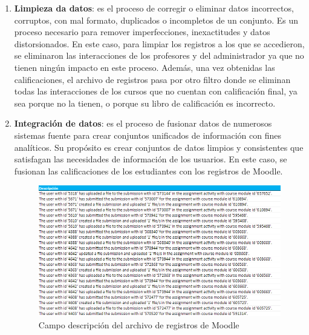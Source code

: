 \begin{enumerate}
    \item \textbf{Limpieza da datos}: es el proceso de corregir o eliminar datos incorrectos, corruptos, con mal formato, duplicados o incompletos de un conjunto. Es un proceso necesario para remover imperfecciones, inexactitudes y datos distorsionados. En este caso, para limpiar los registros a los que se accedieron, se eliminaron las interacciones de los profesores y del administrador ya que no tienen ningún impacto en este proceso. Además, una vez obtenidas las calificaciones, el archivo de registros pasa por otro filtro donde se eliminan todas las interacciones de los cursos que no cuentan con calificación final, ya sea porque no la tienen, o porque su libro de calificación es incorrecto.
    \item \textbf{Integración de datos}: es el proceso de fusionar datos de numerosos sistemas fuente para crear conjuntos unificados de información con fines analíticos. Su propósito es crear conjuntos de datos limpios y consistentes que satisfagan las necesidades de información de los usuarios. En este caso, se fusionan las calificaciones de los estudiantes con los registros de Moodle.
    
    \newpage
    \begin{figure}[htb]
        \centering
        \includegraphics[width = 1 \textwidth]{Graphics/Pasted image 20240101131345.png}
        \caption{Campo descripción del archivo de registros de Moodle}
        \label{descrip}
    \end{figure} 
    

\end{enumerate}
